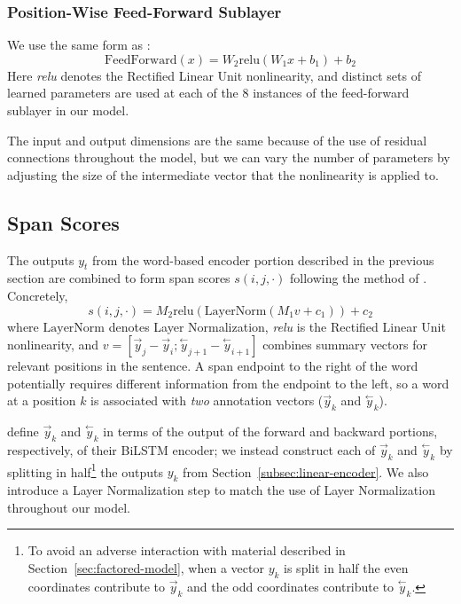 \documentclass[11pt,a4paper]{article}
\begin{document}
\subsubsection{Position-Wise Feed-Forward Sublayer}
\label{subsec:feed-forward}

We use the same form as \citet{vaswani_attention_2017}: $$\mathrm{FeedForward}(x) = W_2 \text{relu}(W_1x + b_1) + b_2$$
Here \textit{relu} denotes the Rectified Linear Unit nonlinearity, and distinct sets of learned parameters are used at each of the 8 instances of the feed-forward sublayer in our model.

The input and output dimensions are the same because of the use of residual connections throughout the model, but we can vary the number of parameters by adjusting the size of the intermediate vector that the nonlinearity is applied to.

\subsection{Span Scores}
\label{subsec:span-encoder}

The outputs $y_t$ from the word-based encoder portion described in the previous section are combined to form span scores $s(i,j,\cdot)$ following the method of \citet{stern_minimal_2017}.
Concretely, $$s(i,j,\cdot) = M_2 \text{relu}(\mathrm{LayerNorm}(M_1v + c_1)) + c_2$$
where $\mathrm{LayerNorm}$ denotes Layer Normalization, \emph{relu} is the Rectified Linear Unit nonlinearity, and $v = [\overset{\rightarrow}{y}_{j} - \overset{\rightarrow}{y}_{i}; \overset{\leftarrow}{y}_{j+1} - \overset{\leftarrow}{y}_{i+1}]$ combines summary vectors for relevant positions in the sentence. A span endpoint to the right of the word potentially requires different information from the endpoint to the left, so a word at a position $k$ is associated with \emph{two} annotation vectors ($\overset{\rightarrow}{y}_{k}$ and $\overset{\leftarrow}{y}_{k}$). 

\citet{stern_minimal_2017} define $\overset{\rightarrow}{y}_{k}$ and $\overset{\leftarrow}{y}_{k}$ in terms of the output of the forward and backward portions, respectively, of their BiLSTM encoder; we instead construct each of $\overset{\rightarrow}{y}_{k}$ and $\overset{\leftarrow}{y}_{k}$ by splitting in half\footnote{To avoid an adverse interaction with material described in Section~\ref{sec:factored-model}, when a vector $y_k$ is split in half the even coordinates contribute to $\overset{\rightarrow}{y}_{k}$ and the odd coordinates contribute to $\overset{\leftarrow}{y}_{k}$.} the outputs $y_k$ from Section~\ref{subsec:linear-encoder}. We also introduce a Layer Normalization step to match the use of Layer Normalization throughout our model. 
\end{document}

